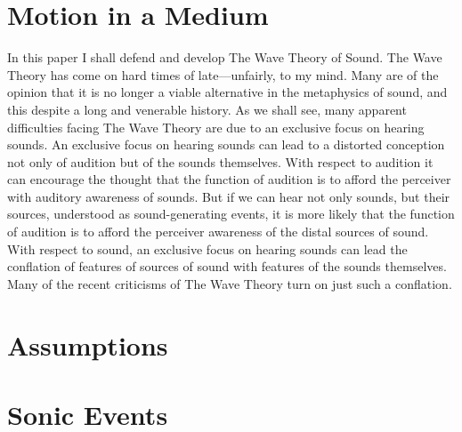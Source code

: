 \documentclass[12pt]{article}
\title{\mytitle}
\author{\myauthor}
\date{} %
\begin{document}
\maketitle

\setlength{\parindent}{1em}


\section{Motion in a Medium} %
\label{sec:motion_in_a_medium}

In this paper I shall defend and develop The Wave Theory of Sound. The Wave Theory has come on hard times of late---unfairly, to my mind. Many are of the opinion that it is no longer a viable alternative in the metaphysics of sound, and this despite a long and venerable history. As we shall see, many apparent difficulties facing The Wave Theory are due to an exclusive focus on hearing sounds. An exclusive focus on hearing sounds can lead to a distorted conception not only of audition but of the sounds themselves. With respect to audition it can encourage the thought that the function of audition is to afford the perceiver with auditory awareness of sounds. But if we can hear not only sounds, but their sources, understood as sound-generating events, it is more likely that the function of audition is to afford the perceiver awareness of the distal sources of sound. With respect to sound, an exclusive focus on hearing sounds can lead the conflation of features of sources of sound with features of the sounds themselves. Many of the recent criticisms of The Wave Theory turn on just such a conflation.


\section{Assumptions} %
\label{sec:section_name}




\section{Sonic Events} %
\label{sec:sonic_events}
\end{document}
